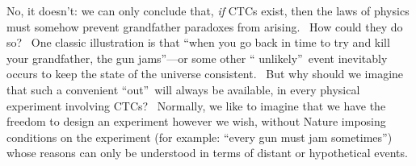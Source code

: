 \documentclass[12pt,onecolumn]{article}%
\begin{document}
No, it doesn't: we can only conclude that, \textit{if} CTCs exist, then the
laws of physics must somehow prevent grandfather paradoxes from arising. \ How
could they do so? \ One classic illustration is that \textquotedblleft when
you go back in time to try and kill your grandfather, the gun
jams\textquotedblright---or some other \textquotedblleft
unlikely\textquotedblright\ event inevitably occurs to keep the state of the
universe consistent. \ But why should we imagine that such a convenient
\textquotedblleft out\textquotedblright\ will always be available, in every
physical experiment involving CTCs? \ Normally, we like to imagine that we
have the freedom to design an experiment however we wish, without Nature
imposing conditions on the experiment (for example: \textquotedblleft every
gun must jam sometimes\textquotedblright) whose reasons can only be understood
in terms of distant or hypothetical events.
\end{document}
